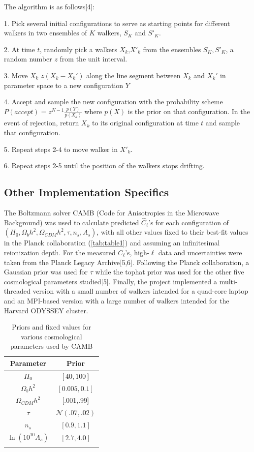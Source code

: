 \documentclass[aps,prd,final,twocolumn]{revtex4}
\begin{document}
 The algorithm is as follows[4]:

1. Pick several initial configurations to serve as starting points for different walkers in two ensembles of $K$ walkers, $S_K$ and $S'_K$.

2. At time $t$, randomly pick a walkers $X_k$,$X'_k$ from the ensembles $S_K,S'_K$, a random number $z$ from the unit interval.

3. Move $X_k$ $z(X_k-X_k')$ along the line segment between $X_k$ and $X_k'$  in parameter space to a new configuration $Y$

4. Accept and sample the new configuration with the probability scheme $P(accept) = z^{N-1}\frac{p(Y)}{p(X_k)}$ where $p(X)$ is the prior on that configuration. In the event of rejection, return $X_k$ to its original configuration at time $t$ and sample that configuration.

5. Repeat steps 2-4 to move walker in $X'_k$.

6. Repeat steps 2-5 until the position of the walkers stops drifting.

\subsection{Other Implementation Specifics}
The Boltzmann solver CAMB (Code for Anisotropies in the Microwave Background) was used to calculate predicted $\hat{C}_\ell$'s for each configuration of $(H_0, \Omega_b h^2, \Omega_{CDM}h^2, \tau, n_s, A_s)$, with all other values fixed to their best-fit values in the Planck collaboration (\ref{tab:table1}) and assuming an infinitesimal reionization depth. For the measured $C_{\ell}$'s, high-$\ell$ data and uncertainties were taken from the Planck Legacy Archive[5,6]. Following the Planck collaboration, a Gaussian prior was used for $\tau$ while the tophat prior was used for the other five cosmological parameters studied[5]. Finally, the project implemented a multi-threaded version with a small number of walkers intended for a quad-core laptop and an MPI-based version with a large number of walkers intended for the Harvard ODYSSEY cluster.

\begin{table}
\caption{\label{tab:table1} Priors and fixed values for various cosmological parameters used by CAMB}
\begin{tabular}{cc}
Parameter & Prior\\ 
\hline
 $H_0$ & $[40,100]$\\
 $\Omega_b h^2$ & $[0.005,0.1]$ \\
 $\Omega_{CDM} h^2$ &[.001,.99]\\
 $\tau$ & $\mathcal{N}(.07,.02)$\\
 $n_s$ & $[0.9,1.1]$\\
 $\ln(10^{10}A_s)$ & $[2.7,4.0]$\\
 \hline
   \label{tab:priors}
\end{tabular}
\end{table}
\end{document}
